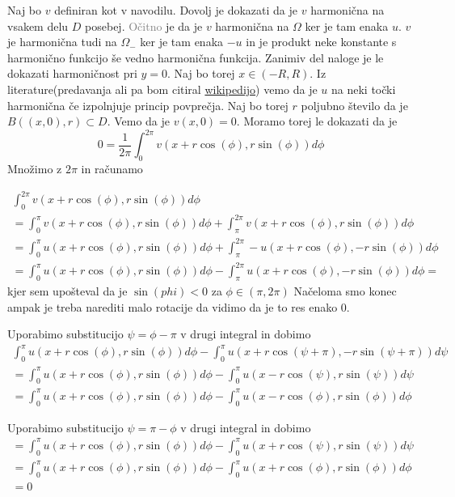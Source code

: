 \documentclass[12pt]{article}
\begin{document}
Naj bo $v$ definiran kot v navodilu. Dovolj je dokazati da je $v$ harmonična na vsakem delu $D$ posebej. 
\textcolor{gray}{Očitno} je da je $v$ harmonična na $\Omega$ ker je tam enaka $u$. $v$ je harmonična tudi na $\Omega_-$ ker je tam enaka $-u$ in je produkt neke konstante s 
harmonično funkcijo še vedno harmonična funkcija. Zanimiv del naloge je le dokazati harmoničnost pri $y=0$.
Naj bo torej $x\in (-R, R)$. Iz literature(predavanja ali pa bom citiral \href{https://en.wikipedia.org/wiki/Harmonic_function}{wikipedijo}) vemo da je $u$ na neki točki 
harmonična če izpolnjuje princip povprečja. Naj bo torej $r$ poljubno število da je $B((x, 0), r)\subset D$. Vemo da je $v(x,0)=0$. Moramo torej le dokazati da je
\[ 0 = \frac{1}{2\pi}\int_0^{2\pi} v(x+r\cos(\phi), r\sin(\phi))d\phi\] Množimo z $2\pi$ in računamo

\begin{align*}
\int_0^{2\pi} v(x+r\cos(\phi), r\sin(\phi))d\phi\\
= \int_0^{\pi} v(x+r\cos(\phi), r\sin(\phi))d\phi + \int_{\pi}^{2\pi} v(x+r\cos(\phi), r\sin(\phi))d\phi\\
= \int_0^{\pi} u(x+r\cos(\phi), r\sin(\phi))d\phi + \int_{\pi}^{2\pi} -u(x+r\cos(\phi), -r\sin(\phi))d\phi \\
= \int_0^{\pi} u(x+r\cos(\phi), r\sin(\phi))d\phi - \int_{\pi}^{2\pi} u(x+r\cos(\phi), -r\sin(\phi))d\phi =
\end{align*}
kjer sem upošteval da je $\sin(phi)<0$ za $\phi\in (\pi, 2\pi)$
Načeloma smo konec ampak je treba narediti malo rotacije da vidimo da je to res enako 0. 

Uporabimo substitucijo $\psi = \phi - \pi$ v drugi integral in dobimo
\begin{align*}
\int_0^{\pi} u(x+r\cos(\phi), r\sin(\phi))d\phi - \int_{0}^{\pi} u(x+r\cos(\psi+\pi), -r\sin(\psi+\pi))d\psi \\
= \int_0^{\pi} u(x+r\cos(\phi), r\sin(\phi))d\phi - \int_{0}^{\pi} u(x-r\cos(\psi), r\sin(\psi))d\psi \\
= \int_0^{\pi} u(x+r\cos(\phi), r\sin(\phi))d\phi - \int_{0}^{\pi} u(x-r\cos(\phi), r\sin(\phi))d\phi
\end{align*}

Uporabimo substitucijo $\psi = \pi - \phi$ v drugi integral in dobimo
\begin{align*}
= \int_0^{\pi} u(x+r\cos(\phi), r\sin(\phi))d\phi - \int_{0}^{\pi} u(x+r\cos(\psi), r\sin(\psi))d\psi \\
= \int_0^{\pi} u(x+r\cos(\phi), r\sin(\phi))d\phi - \int_{0}^{\pi} u(x+r\cos(\phi), r\sin(\phi))d\phi \\
= 0
\end{align*}
\end{document}
